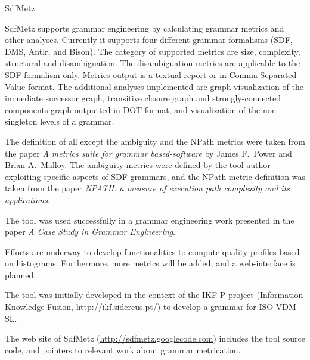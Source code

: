 \begin{hcarentry}{SdfMetz}
\makeheader

SdfMetz supports grammar engineering by calculating grammar metrics and other analyses. 
Currently it supports four different grammar formalisms (SDF, DMS, Antlr, and Bison).
The category of supported metrics are size, complexity, structural and disambiguation.
The disambiguation metrics are applicable to the SDF formalism only.
Metrics output is a textual report or in Comma Separated Value format.
The additional analyses implemented are graph visualization of the immediate successor graph, transitive closure graph and strongly-connected components graph outputted in DOT format, and visualization of the non-singleton levels of a grammar.

The definition of all except the ambiguity and the NPath metrics were taken from the paper
\emph{A metrics suite for grammar based-software} by James F.\ Power and Brian A.\ Malloy. 
The ambiguity metrics were defined by the tool author exploiting specific aspects of SDF grammars, and the NPath metric definition was taken from the paper \emph{NPATH: a measure of execution path complexity and its applications}.

The tool was used successfully in a grammar engineering work presented in the paper \emph{A Case Study in Grammar Engineering}.

\FuturePlans
Efforts are underway to develop functionalities to compute quality profiles based on histograms.
Furthermore, more metrics will be added, and a web-interface is planned.

\FinalNote
The tool was initially developed in the context of the IKF-P project (Information Knowledge Fusion, \url{http://ikf.sidereus.pt/}) to develop a grammar for ISO VDM-SL.

\FurtherReading
The web site of SdfMetz
(\url{http://sdfmetz.googlecode.com}) includes the tool source code, and pointers to relevant work about grammar metrication.
\end{hcarentry}

